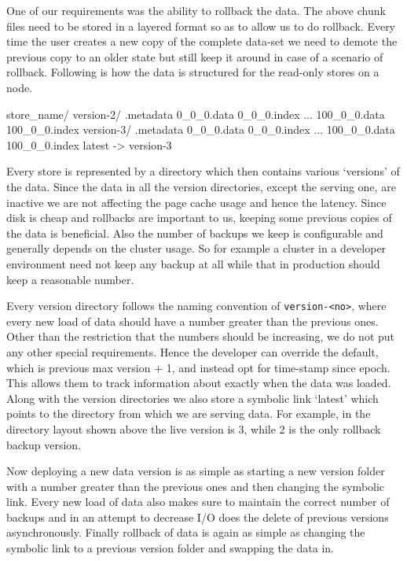 \documentclass[10pt,twocolumn,preprint,nonatbib,numbers]{sigplanconf}
\begin{document}
One of our requirements was the ability to rollback the data. The above chunk files need to be stored in a layered format so as to allow us to do rollback. Every time the user creates a new copy of the complete data-set we need to demote the previous copy to an older state but still keep it around in case of a scenario of rollback. Following is how the data is structured for the read-only stores on a \projectname{} node. 

\scriptsize
\begin{verbatimtab}
store_name/
  version-2/
    .metadata
    0_0_0.data
    0_0_0.index
    ...
    100_0_0.data
    100_0_0.index
  version-3/
    .metadata
    0_0_0.data
    0_0_0.index
    ...
    100_0_0.data
    100_0_0.index
  latest -> version-3
\end{verbatimtab}
\normalsize

Every store is represented by a directory which then contains various `versions' of the data. Since the data in all the version directories, except the serving one, are inactive we are not affecting the page cache usage and hence the latency. Since disk is cheap and rollbacks are important to us, keeping some previous copies of the data is beneficial. Also the number of backups we keep is configurable and generally depends on the cluster usage. So for example a cluster in a developer environment need not keep any backup at all while that in production should keep a reasonable number.

Every version directory follows the naming convention of \verb=version-<no>=, where every new load of data should have a number greater than the previous ones. Other than the restriction that the numbers should be increasing, we do not put any other special requirements. Hence the developer can override the default, which is previous max version + 1, and instead opt for time-stamp since epoch. This allows them to track information about exactly when the data was loaded. Along with the version directories we also store a symbolic link `latest' which points to the directory from which we are serving data. For example, in the directory layout shown above the live version is 3, while 2 is the only rollback backup version. 

Now deploying a new data version is as simple as starting a new version folder with a number greater than the previous ones and then changing the symbolic link. Every new load of data also makes sure to maintain the correct number of backups and in an attempt to decrease I/O does the delete of previous versions asynchronously. Finally rollback of data is again as simple as changing the symbolic link to a previous version folder and swapping the data in. 
\end{document}
